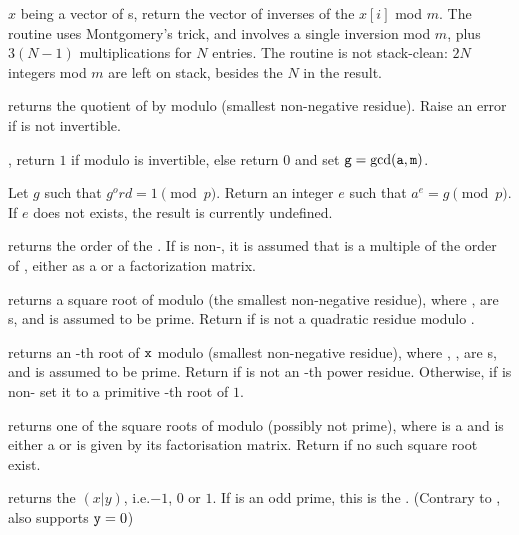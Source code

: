  $x$ being a vector of s, return
the vector of inverses of the $x[i]$ mod $m$. The routine uses Montgomery's
trick, and involves a single inversion mod $m$, plus $3(N-1)$ multiplications
for $N$ entries. The routine is not stack-clean: $2N$ integers mod $m$
are left on stack, besides the $N$ in the result.

 returns the quotient of  by
 modulo  (smallest non-negative residue). Raise an error if
 is not invertible.

,  return $1$ if 
modulo  is invertible, else return $0$ and set
${\tt g} = {\rm gcd}({\tt a},{\tt m})$.

 Let $g$ such that $g^ord=1
\pmod{p}$. Return an integer $e$ such that $a^e=g \pmod{p}$. If $e$ does not
exists, the result is currently undefined.

 returns the order of the
 . If  is non-, it is assumed that 
is a multiple of the order of , either as a  or a
factorization matrix.

 returns a square root of  modulo
 (the smallest non-negative residue), where ,  are
s, and  is assumed to be prime. Return 
if  is not a quadratic residue modulo .

 returns an -th
root of ${\tt x}$ modulo  (smallest non-negative residue), where
, ,  are s, and  is assumed to be prime.
Return  if  is not an -th power residue. Otherwise,
if  is non- set it to a primitive -th root of $1$.

 returns one of the square roots of 
modulo  (possibly not prime), where  is a  and 
is either a  or is given by its factorisation matrix.  Return
 if no such square root exist.

 returns the  $(x|y)$,
i.e.$-1$, $0$ or $1$. If  is an odd prime, this is the . (Contrary to ,  also supports ${\tt y} = 0$)

